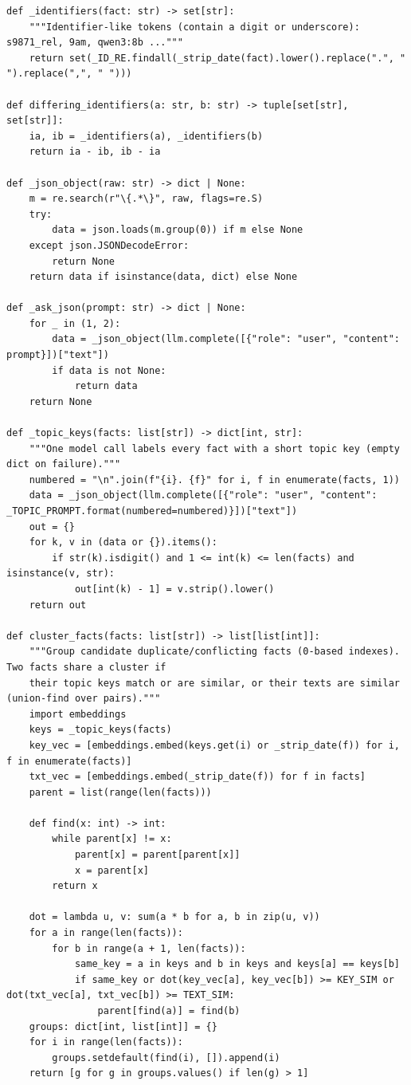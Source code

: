 \documentclass[11pt]{article}
\begin{document}
\begin{lstlisting}
def _identifiers(fact: str) -> set[str]:
    """Identifier-like tokens (contain a digit or underscore): s9871_rel, 9am, qwen3:8b ..."""
    return set(_ID_RE.findall(_strip_date(fact).lower().replace(".", " ").replace(",", " ")))

def differing_identifiers(a: str, b: str) -> tuple[set[str], set[str]]:
    ia, ib = _identifiers(a), _identifiers(b)
    return ia - ib, ib - ia

def _json_object(raw: str) -> dict | None:
    m = re.search(r"\{.*\}", raw, flags=re.S)
    try:
        data = json.loads(m.group(0)) if m else None
    except json.JSONDecodeError:
        return None
    return data if isinstance(data, dict) else None

def _ask_json(prompt: str) -> dict | None:
    for _ in (1, 2):
        data = _json_object(llm.complete([{"role": "user", "content": prompt}])["text"])
        if data is not None:
            return data
    return None

def _topic_keys(facts: list[str]) -> dict[int, str]:
    """One model call labels every fact with a short topic key (empty dict on failure)."""
    numbered = "\n".join(f"{i}. {f}" for i, f in enumerate(facts, 1))
    data = _json_object(llm.complete([{"role": "user", "content": _TOPIC_PROMPT.format(numbered=numbered)}])["text"])
    out = {}
    for k, v in (data or {}).items():
        if str(k).isdigit() and 1 <= int(k) <= len(facts) and isinstance(v, str):
            out[int(k) - 1] = v.strip().lower()
    return out

def cluster_facts(facts: list[str]) -> list[list[int]]:
    """Group candidate duplicate/conflicting facts (0-based indexes). Two facts share a cluster if
    their topic keys match or are similar, or their texts are similar (union-find over pairs)."""
    import embeddings
    keys = _topic_keys(facts)
    key_vec = [embeddings.embed(keys.get(i) or _strip_date(f)) for i, f in enumerate(facts)]
    txt_vec = [embeddings.embed(_strip_date(f)) for f in facts]
    parent = list(range(len(facts)))

    def find(x: int) -> int:
        while parent[x] != x:
            parent[x] = parent[parent[x]]
            x = parent[x]
        return x

    dot = lambda u, v: sum(a * b for a, b in zip(u, v))
    for a in range(len(facts)):
        for b in range(a + 1, len(facts)):
            same_key = a in keys and b in keys and keys[a] == keys[b]
            if same_key or dot(key_vec[a], key_vec[b]) >= KEY_SIM or dot(txt_vec[a], txt_vec[b]) >= TEXT_SIM:
                parent[find(a)] = find(b)
    groups: dict[int, list[int]] = {}
    for i in range(len(facts)):
        groups.setdefault(find(i), []).append(i)
    return [g for g in groups.values() if len(g) > 1]
\end{lstlisting}
\end{document}

